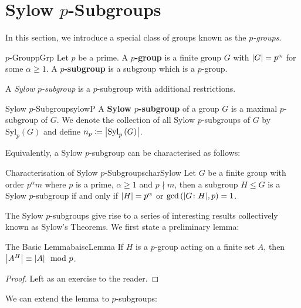 \documentclass[math]{amznotes}
\theoremstyle{remark}
\newcommand{\0}{\mathbf{0}}
\newcommand{\1}{\mathbf{1}}
\begin{document}
\section{Sylow $p$-Subgroups}
In this section, we introduce a special class of groups known as the $p$\textit{-groups}.
\begin{dfnbox}{$p$-Group}{pGrp}
    Let $p$ be a prime. A {\color{red} \textbf{$p$-group}} is a finite group $G$ with ${\left\lvert {G} \right\rvert} = p^{\alpha}$ for some $\alpha \geq 1$. A {\color{red} \textbf{$p$-subgroup}} is a subgroup which is a $p$-group.
\end{dfnbox}
A \textit{Sylow $p$-subgroup} is a $p$-subgroup with additional restrictions.
\begin{dfnbox}{Sylow $p$-Subgroup}{sylowP}
    A {\color{red} \textbf{Sylow $p$-subgroup}} of a group $G$ is a maximal $p$-subgroup of $G$. We denote the collection of all Sylow $p$-subgroups of $G$ by $\mathrm{Syl}_p\left(G\right)$ and define $n_p \coloneqq {\left\lvert {\mathrm{Syl}_p\left(G\right)} \right\rvert}$.
\end{dfnbox}
Equivalently, a Sylow $p$-subgroup can be characterised as follows:
\begin{probox}{Characterisation of Sylow $p$-Subgroups}{charSylow}
    Let $G$ be a finite group with order $p^{\alpha}m$ where $p$ is a prime, $\alpha \geq 1$ and $p \nmid m$, then a subgroup $H \leq G$ is a Sylow $p$-subgroup if and only if ${\left\lvert {H} \right\rvert} = p^{\alpha}$ or $\gcd\left({\left\lvert {G \colon H} \right\rvert}, p\right) = 1$.
\end{probox}
The Sylow $p$-subgroups give rise to a series of interesting results collectively known as Sylow's Theorems. We first state a preliminary lemma:
\begin{lembox}{The Basic Lemma}{baiscLemma}
    If $H$ is a $p$-group acting on a finite set $A$, then ${\left\lvert {A^H} \right\rvert} \equiv {\left\lvert {A} \right\rvert} \mod p$.
    \tcblower
    \begin{proof}
        Left as an exercise to the reader.
    \end{proof}
\end{lembox}
We can extend the lemma to $p$-subgroups:
\end{document}
